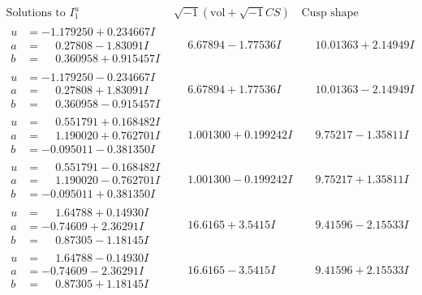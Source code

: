 \documentclass[1p]{elsarticle_modified}
\theoremstyle{definition}
\newcommand{\I}{\sqrt{-1}}
\begin{document}
$$\begin{array}{c|c|c}  
\text{Solutions to }I^u_{1}& \I (\text{vol} + \sqrt{-1}CS) & \text{Cusp shape}\\
 \hline 
\begin{aligned}
u &= -1.179250 + 0.234667 I \\
a &= \phantom{-}0.27808 - 1.83091 I \\
b &= \phantom{-}0.360958 + 0.915457 I\end{aligned}
 & \phantom{-}6.67894 - 1.77536 I & \phantom{-}10.01363 + 2.14949 I \\ \hline\begin{aligned}
u &= -1.179250 - 0.234667 I \\
a &= \phantom{-}0.27808 + 1.83091 I \\
b &= \phantom{-}0.360958 - 0.915457 I\end{aligned}
 & \phantom{-}6.67894 + 1.77536 I & \phantom{-}10.01363 - 2.14949 I \\ \hline\begin{aligned}
u &= \phantom{-}0.551791 + 0.168482 I \\
a &= \phantom{-}1.190020 + 0.762701 I \\
b &= -0.095011 - 0.381350 I\end{aligned}
 & \phantom{-}1.001300 + 0.199242 I & \phantom{-}9.75217 - 1.35811 I \\ \hline\begin{aligned}
u &= \phantom{-}0.551791 - 0.168482 I \\
a &= \phantom{-}1.190020 - 0.762701 I \\
b &= -0.095011 + 0.381350 I\end{aligned}
 & \phantom{-}1.001300 - 0.199242 I & \phantom{-}9.75217 + 1.35811 I \\ \hline\begin{aligned}
u &= \phantom{-}1.64788 + 0.14930 I \\
a &= -0.74609 + 2.36291 I \\
b &= \phantom{-}0.87305 - 1.18145 I\end{aligned}
 & \phantom{-}16.6165 + 3.5415 I & \phantom{-}9.41596 - 2.15533 I \\ \hline\begin{aligned}
u &= \phantom{-}1.64788 - 0.14930 I \\
a &= -0.74609 - 2.36291 I \\
b &= \phantom{-}0.87305 + 1.18145 I\end{aligned}
 & \phantom{-}16.6165 - 3.5415 I & \phantom{-}9.41596 + 2.15533 I \\ \hline\begin{aligned}

\end{aligned}
\end{array}$$
\end{document}
